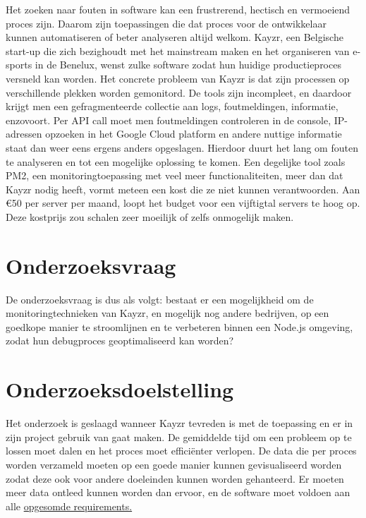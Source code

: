 Het zoeken naar fouten in software kan een frustrerend, hectisch en vermoeiend proces zijn. Daarom zijn toepassingen die dat proces voor de ontwikkelaar kunnen automatiseren of beter analyseren altijd welkom. Kayzr, een Belgische start-up die zich bezighoudt met het mainstream maken en het organiseren van e-sports in de Benelux, wenst zulke software zodat hun huidige productieproces versneld kan worden. 
Het concrete probleem van Kayzr is dat zijn processen op verschillende plekken worden gemonitord. De tools zijn incompleet, en daardoor krijgt men een gefragmenteerde collectie aan logs, foutmeldingen, informatie, enzovoort.  Per API call moet men foutmeldingen controleren in de console, IP-adressen opzoeken in het Google Cloud platform en andere nuttige informatie staat dan weer eens ergens anders opgeslagen. Hierdoor duurt het lang om fouten te analyseren en tot een mogelijke oplossing te komen. Een degelijke tool zoals PM2, een monitoringtoepassing met veel meer functionaliteiten, meer dan dat Kayzr nodig heeft, vormt meteen een kost die ze niet kunnen verantwoorden. Aan \euro 50 per server per maand, loopt het budget voor een vijftigtal servers te hoog op. Deze kostprijs zou schalen zeer moeilijk of zelfs onmogelijk maken.

\section{Onderzoeksvraag}
\label{sec:onderzoeksvraag}

De onderzoeksvraag is dus als volgt: bestaat er een mogelijkheid om de monitoringtechnieken van Kayzr, en mogelijk nog andere bedrijven, op een goedkope manier te stroomlijnen en te verbeteren binnen een Node.js omgeving, zodat hun debugproces geoptimaliseerd kan worden? 


\section{Onderzoeksdoelstelling}
\label{sec:onderzoeksdoelstelling}

Het onderzoek is geslaagd wanneer Kayzr tevreden is met de toepassing en er in zijn project gebruik van gaat maken. De gemiddelde tijd om een probleem op te lossen moet dalen en het proces moet efficiënter verlopen. De data die per proces worden verzameld moeten op een goede manier kunnen gevisualiseerd worden zodat deze ook voor andere doeleinden kunnen worden gehanteerd. Er moeten meer data ontleed kunnen worden dan ervoor, en de software moet voldoen aan alle \hyperref[sec:requirements]{opgesomde requirements.}


